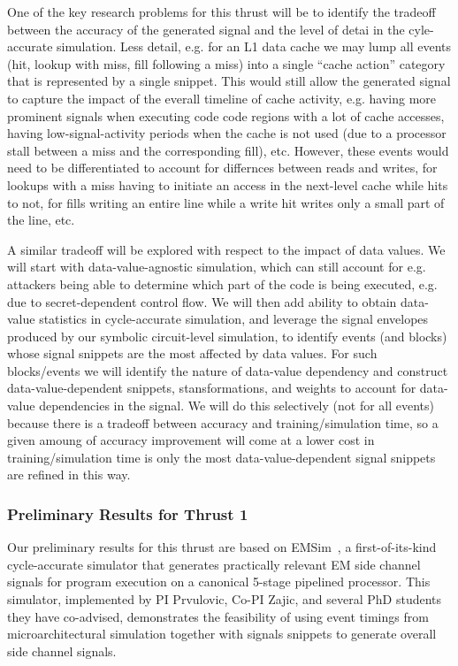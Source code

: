 One of the key research problems for this thrust will be to identify the tradeoff between the accuracy of the generated signal and the level of detai in the cyle-accurate simulation. Less detail, e.g. for an L1 data cache we may lump all events (hit, lookup with miss, fill following a miss) into a single ``cache action''  category that is represented by a single snippet. This would still allow the generated signal to capture the impact of the everall timeline of cache activity, e.g. having more prominent signals when executing code code regions with a lot of cache accesses, having low-signal-activity periods when the cache is not used (due to a processor stall between a miss and the corresponding fill), etc. However, these events would need to be differentiated to account for differnces between reads and writes, for lookups with a miss having to initiate an access in the next-level cache while hits to not, for fills writing an entire line while a write hit writes only a small part of the line, etc.

A similar tradeoff will be explored with respect to the impact of data values. We will start with data-value-agnostic simulation, which can still account for e.g. attackers being able to determine which part of the code is being executed, e.g. due to secret-dependent control flow. We will then add ability to obtain data-value statistics in cycle-accurate simulation,
and leverage the signal envelopes produced by our symbolic circuit-level simulation, to identify events (and blocks) whose signal snippets are the most affected by data values. For such blocks/events we will identify the nature of data-value dependency and construct data-value-dependent snippets, stansformations, and weights to account for data-value dependencies in the signal. We will do this selectively (not for all events) because there is a tradeoff between accuracy and training/simulation time, so a given amoung of accuracy improvement will come at a lower cost in training/simulation time is only the most data-value-dependent signal snippets are refined in this way.

\subsubsection{Preliminary Results for Thrust 1}

Our preliminary results for this thrust are based on EMSim~\cite{Nader2020}, a first-of-its-kind cycle-accurate simulator that generates practically relevant EM side channel signals for program execution on a canonical 5-stage pipelined processor. This simulator,
implemented by PI Prvulovic, Co-PI Zajic, and several PhD students they have co-advised, demonstrates the feasibility of using event timings from microarchitectural simulation together with signals snippets to generate overall side channel signals.

